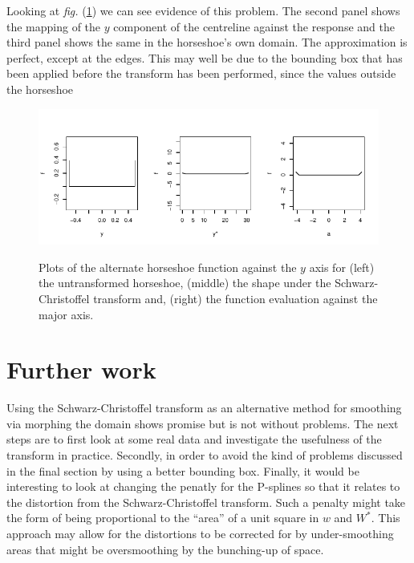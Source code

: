 \documentclass[a4paper,10pt]{amsart}
\newcommand{\sch}{Schwarz-Christoffel }
\newcommand{\fig}[1]{\emph{fig.} (\ref{#1})}
\begin{document}
Looking at \fig{altcentrelinelineplot} we can see evidence of this problem. The second panel shows the mapping of the $y$ component of the centreline against the response and the third panel shows the same in the horseshoe's own domain. The approximation is perfect, except at the edges. This may well be due to the bounding box that has been applied before the transform has been performed, since the values outside the horseshoe 

\begin{figure}
\centering
\includegraphics[trim=0in 0in 0in 0in]{figs/altcentrelinelineplots.pdf} \\
\caption{Plots of the alternate horseshoe function against the $y$ axis for (left) the untransformed horseshoe, (middle) the shape under the \sch transform and, (right) the function evaluation against the major axis.}
\label{altcentrelinelineplot}
\end{figure}


\section{Further work}

Using the \sch transform as an alternative method for smoothing via morphing the domain shows promise but is not without problems. The next steps are to first look at some real data and investigate the usefulness of the transform in practice. Secondly, in order to avoid the kind of problems discussed in the final section by using a better bounding box. Finally, it would be interesting to look at changing the penatly for the P-splines so that it relates to the distortion from the \sch transform. Such a penalty might take the form of being proportional to the ``area'' of a unit square in $w$ and $W^*$. This approach may allow for the distortions to be corrected for by under-smoothing areas that might be oversmoothing by the bunching-up of space.






\end{document}
